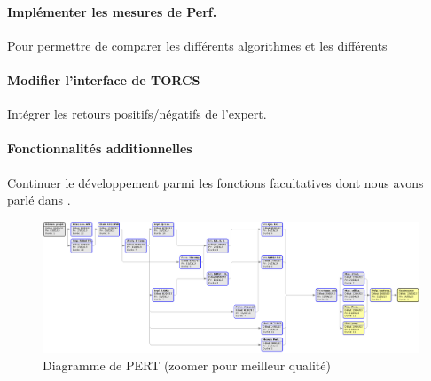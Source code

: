 \documentclass[a4paper,12pt]{article}
\begin{document}
      \paragraph{Implémenter les mesures de Perf.} Pour permettre de comparer les différents algorithmes et les différents 
      
      \paragraph{Modifier l'interface de TORCS} Intégrer les retours positifs/négatifs de l'expert.
      
      \paragraph{Fonctionnalités additionnelles} Continuer le développement parmi les fonctions facultatives dont nous
      avons parlé dans \cite{CdC}.
      
      \begin{figure}[H]
	\centerline{\includegraphics[width=19cm, clip=true, trim= 0 0 0 0]{../images/Gantt_PERT.png} }
	\caption{Diagramme de PERT \scriptsize{(zoomer pour meilleur qualité)}}
      \end{figure}
    
\end{document}
